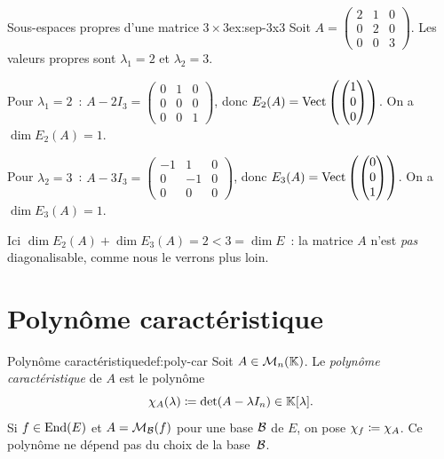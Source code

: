 \begin{example}{Sous-espaces propres d'une matrice $3\times 3$}{ex:sep-3x3}
  Soit $A=\begin{pmatrix}2&1&0\\0&2&0\\0&0&3\end{pmatrix}$.
  Les valeurs propres sont $\lambda_1=2$ et $\lambda_2=3$.

  Pour $\lambda_1=2$~:
  $A-2I_3=\begin{pmatrix}0&1&0\\0&0&0\\0&0&1\end{pmatrix}$,
  donc $E_2(A)=\operatorname{Vect}\left(\begin{pmatrix}1\\0\\0\end{pmatrix}\right)$.
  On a $\dim E_2(A)=1$.

  Pour $\lambda_2=3$~:
  $A-3I_3=\begin{pmatrix}-1&1&0\\0&-1&0\\0&0&0\end{pmatrix}$,
  donc $E_3(A)=\operatorname{Vect}\left(\begin{pmatrix}0\\0\\1\end{pmatrix}\right)$.
  On a $\dim E_3(A)=1$.

  Ici $\dim E_2(A)+\dim E_3(A)=2<3=\dim E$~: la matrice $A$ n'est
  \emph{pas} diagonalisable, comme nous le verrons plus loin.
\end{example}

\section{Polynôme caractéristique}\label{sec:poly-car}

\begin{definition}{Polynôme caractéristique}{def:poly-car}
  Soit $A\in\mathcal{M}_n({\mathbb{K}})$. Le \emph{polynôme caractéristique}%
   de $A$ est le polynôme
  \[
    \chi_A(\lambda)\coloneqq\det(A-\lambda I_n)\in{\mathbb{K}}[\lambda].
  \]
  Si $f\in\operatorname{End}(E)$ et $A=\mathcal{M}_{\mathcal{B}}(f)$ pour une base ${\mathcal{B}}$ de $E$, on
  pose $\chi_f\coloneqq\chi_A$. Ce polynôme ne dépend pas du choix de la
  base~${\mathcal{B}}$.
\end{definition}

